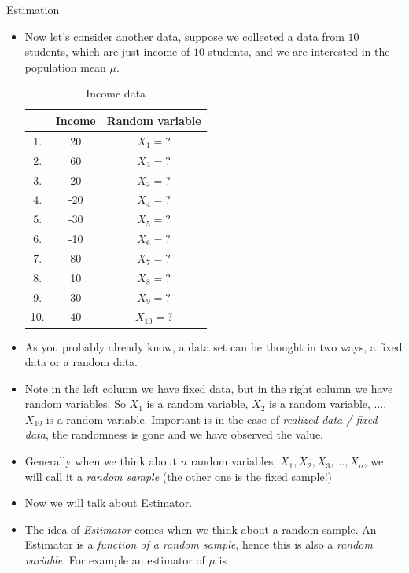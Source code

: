\documentclass[8pt, usepdftitle=false]{beamer}
\begin{document}
\begin{frame}[allowframebreaks]{Estimation}
\begin{itemize}
 \framebreak


\item Now let's consider another data, suppose we collected a data from $10$ students, which are just income of $10$ students, and we are interested in the population mean $\mu$.


    \small{
      \begin{table}[H]
      \begin{tabular}{|c|c|c|}
      \hline & Income & Random variable \\
      \hline 1. & 20 & $X_1=?$ \\
      \hline 2. & 60 & $X_2=?$ \\
      \hline 3. & 20 & $X_3=?$ \\
      \hline 4. & -20 & $X_4=?$ \\
      \hline 5. & -30 & $X_5=?$ \\
      \hline 6. & -10 & $X_6=?$ \\
      \hline 7. & 80 & $X_7=?$ \\
      \hline 8. & 10 & $X_8=?$ \\
      \hline 9. & 30 & $X_9=?$ \\
      \hline 10. & 40 & $X_{10}=?$ \\
      \hline
      \end{tabular}
      \caption{Income data}
      \end{table}
    }


\item As you probably already know, a data set can be thought in two ways, a fixed data or a random data. 

\item Note in the left column we have fixed data, but in the right column we have random variables. So  $X_1$ is a random variable, $X_2$ is a random variable, $\ldots$, $X_{10}$ is a random variable. Important is in the case of  \emph{realized data / fixed data},  the randomness is gone and we have observed the value.





 \item Generally  when we think about $n$ random variables,  $X_1, X_2, X_3, \ldots, X_{n}$, we will call it a \emph{random sample} (the other one is the fixed sample!)

 \item Now we will talk about Estimator. 

 \item The idea of \emph{Estimator} comes when we think about a random sample. An Estimator is a \emph{function of a random sample}, hence this is also a \emph{random variable}. For example an estimator of $\mu$ is 


\end{itemize}
\end{frame}
\end{document}
